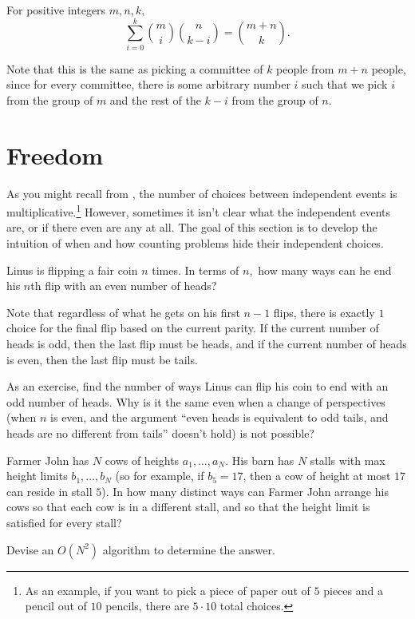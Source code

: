 \documentclass[blue,onecol]{shooting}
\begin{document}
\begin{theo}[Vandermonde]
For positive integers $m,n,k,$
\[\sum_{i=0}^k\binom {m}{i}\binom {n}{k-i}=\binom{m+n}{k}.\]
\end{theo}

\begin{pro}
Note that this is the same as picking a committee of $k$ people from $m+n$ people, since for every committee, there is some arbitrary number $i$ such that we pick $i$ from the group of $m$ and the rest of the $k-i$ from the group of $n.$
\end{pro}

\section{Freedom}

As you might recall from , the number of choices between independent events is multiplicative.\footnote{As an example, if you want to pick a piece of paper out of $5$ pieces and a pencil out of $10$ pencils, there are $5\cdot 10$ total choices.} However, sometimes it isn't clear what the independent events are, or if there even are any at all. The goal of this section is to develop the intuition of when and how counting problems hide their independent choices.

\begin{exam}[Coins]
Linus is flipping a fair coin $n$ times. In terms of $n,$ how many ways can he end his $n$th flip with an even number of heads?
\end{exam}

\begin{sol}
Note that regardless of what he gets on his first $n-1$ flips, there is exactly $1$ choice for the final flip based on the current parity. If the current number of heads is odd, then the last flip must be heads, and if the current number of heads is even, then the last flip must be tails.
\end{sol}

As an exercise, find the number of ways Linus can flip his coin to end with an odd number of heads. Why is it the same even when a change of perspectives (when $n$ is even, and the argument ``even heads is equivalent to odd tails, and heads are no different from tails'' doesn't hold) is not possible?


\begin{exam}
Farmer John has $N$ cows of heights $a_1,\ldots,a_N.$ His barn has $N$ stalls with max height limits $b_1,\ldots,b_N$ (so for example, if $b_5=17$, then a cow of height at most $17$ can reside in stall $5$). In how many distinct ways can Farmer John arrange his cows so that each cow is in a different stall, and so that the height limit is satisfied for every stall? 

Devise an $O(N^2)$ algorithm to determine the answer.
\end{exam}
\end{document}
